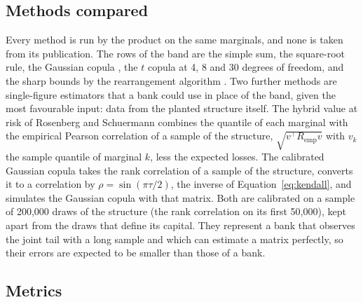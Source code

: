 \subsection{Methods compared}
\label{sec:design-methods}

Every method is run by the product on the same marginals, and none is taken from its publication. The rows of the band are the
simple sum, the square-root rule, the Gaussian copula \citep{li2000,rosenberg2006}, the $t$ copula \citep{demarta2005} at
4, 8 and 30 degrees of freedom, and the sharp bounds by the rearrangement algorithm \citep{puccetti2012,epr2013}. Two further
methods are single-figure estimators that a bank could use in place of the band, given the most favourable input: data from the
planted structure itself. The hybrid value at risk of Rosenberg and Schuermann \citep{rosenberg2006} combines the quantile of each
marginal with the empirical Pearson correlation of a sample of the structure, $\sqrt{v^\top R_{\mathrm{emp}}v}$ with $v_k$ the
sample quantile of marginal $k$, less the expected losses. The calibrated Gaussian copula takes the rank correlation of a sample of
the structure, converts it to a correlation by $\rho=\sin(\pi\tau/2)$, the inverse of Equation~\ref{eq:kendall}, and simulates the
Gaussian copula with that matrix. Both are calibrated on a sample of 200,000 draws of the structure (the rank correlation on its first 50,000), kept apart from
the draws that define its capital. They represent a bank that observes the joint tail with a long sample and which can estimate a matrix perfectly, so
their errors are expected to be smaller than those of a bank.

\subsection{Metrics}
\label{sec:design-metrics}


